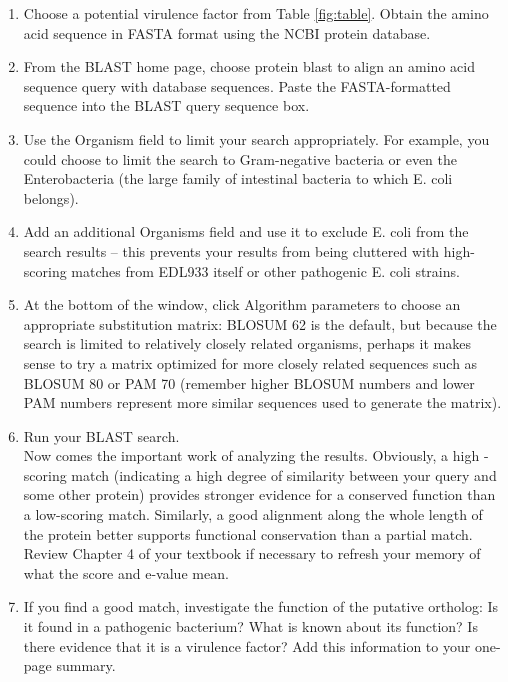 \begin{enumerate}
	\item Choose a potential virulence factor from Table \ref{fig:table}.  Obtain the amino acid sequence in FASTA format using the NCBI protein database.

	\item From the BLAST home page, choose protein blast to align an amino acid sequence query with database sequences.  Paste the FASTA-formatted sequence into the BLAST query sequence box.

	\item  Use the Organism field to limit your search appropriately.  For example, you could choose to limit the search to Gram-negative bacteria or even the Enterobacteria (the large family of intestinal bacteria to which E. coli belongs).

	\item Add an additional Organisms field and use it to exclude E. coli from the search results – this prevents your results from being cluttered with high-scoring matches from EDL933 itself or other pathogenic E. coli strains.
	
	\item  At the bottom of the window, click Algorithm parameters to choose an appropriate substitution matrix: BLOSUM 62 is the default, but because the search is limited to relatively closely related organisms, perhaps it makes sense to try a matrix optimized for more closely related sequences such as BLOSUM 80 or PAM 70 (remember higher BLOSUM numbers and lower PAM numbers represent more similar sequences used to generate the matrix).

	\item Run your BLAST search. \\

Now comes the important work of analyzing the results. Obviously, a high -scoring match (indicating a high degree of similarity between your query and some other protein) provides stronger evidence for a conserved function than a low-scoring match.  Similarly, a good alignment along the whole length of the protein better supports functional conservation than a partial match.  Review Chapter 4 of your textbook if necessary to refresh your memory of what the score and e-value mean.  

	\item  If you find a good match, investigate the function of the putative ortholog: Is it found in a pathogenic bacterium?  What is known about its function?  Is there evidence that it is a virulence factor?  Add this information to your one-page summary.
	

\end{enumerate}

